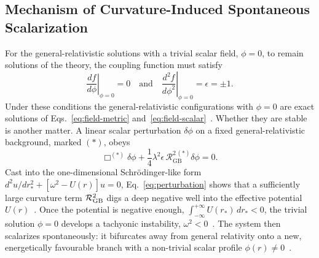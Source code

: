 \subsection{Mechanism of Curvature-Induced Spontaneous Scalarization}
\label{sec:scalarization}

For the general-relativistic solutions with a trivial scalar field, $\phi = 0$, to remain solutions of the theory, the coupling function must satisfy~\citep{Doneva2017_BH}
\begin{equation}
  \left. \frac{df}{d\phi} \right|_{\phi = 0} = 0
  \quad \text{and} \quad
  \left. \frac{d^2 f}{d\phi^2} \right|_{\phi = 0} = \epsilon = \pm 1.
  \label{eq:coupling-conditions}
\end{equation}
Under these conditions the general-relativistic configurations with $\phi = 0$ are exact solutions of Eqs.~\eqref{eq:field-metric} and~\eqref{eq:field-scalar}~\citep{Doneva2017_BH,Doneva2017_NS}. Whether they are stable is another matter. A linear scalar perturbation $\delta\phi$ on a fixed general-relativistic background, marked $(*)$, obeys~\citep{TODO_LinearStability}
\begin{equation}
  \Box^{(*)} \delta\phi + \frac{1}{4} \lambda^2 \epsilon\, \mathcal{R}^{2\,(*)}_{\mathrm{GB}} \delta\phi = 0.
  \label{eq:perturbation}
\end{equation}
Cast into the one-dimensional Schr\"odinger-like form $d^2 u / dr_*^2 + \left[ \omega^2 - U(r) \right] u = 0$, Eq.~\eqref{eq:perturbation} shows that a sufficiently large curvature term $\mathcal{R}^2_{\mathrm{GB}}$ digs a deep negative well into the effective potential $U(r)$~\citep{TODO_EffectivePotential}. Once the potential is negative enough, $\int_{-\infty}^{+\infty} U(r_*)\, dr_* < 0$, the trivial solution $\phi = 0$ develops a tachyonic instability, $\omega^2 < 0$~\citep{DamourEspositoFarese1993}. The system then scalarizes spontaneously: it bifurcates away from general relativity onto a new, energetically favourable branch with a non-trivial scalar profile $\phi(r) \neq 0$~\citep{Doneva2017_BH,Doneva2017_NS}.
